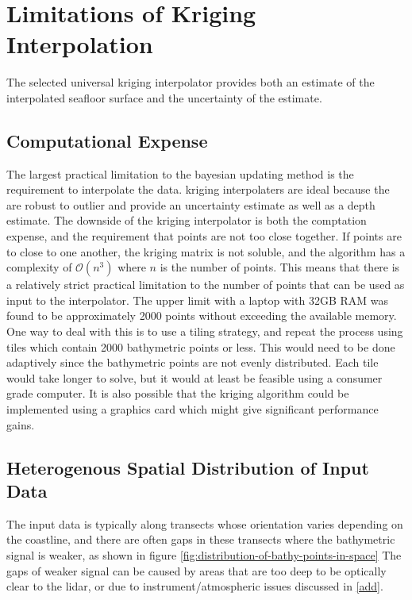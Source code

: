 \section{Limitations of Kriging Interpolation}

The selected universal kriging interpolator provides both an estimate of the interpolated seafloor surface and the uncertainty of the estimate.

\subsection{Computational Expense}

The largest practical limitation to the bayesian updating method is the requirement to interpolate the data. kriging interpolaters are ideal because the are robust to outlier and provide an uncertainty estimate as well as a depth estimate. The downside of the kriging interpolator is both the comptation expense, and the requirement that points are not too close together. If points are to close to one another, the kriging matrix is not soluble, and the algorithm has a complexity of $\mathcal{O}(n^3)$ where $n$ is the number of points. This means that there is a relatively strict practical limitation to the number of points that can be used as input to the interpolator. The upper limit with a laptop with 32GB RAM was found to be approximately 2000 points without exceeding the available memory. One way to deal with this is to use a tiling strategy, and repeat the process using tiles which contain 2000 bathymetric points or less. This would need to be done adaptively since the bathymetric points are not evenly distributed. Each tile would take longer to solve, but it would at least be feasible using a consumer grade computer. It is also possible that the kriging algorithm could be implemented using a graphics card which might give significant performance gains.

\subsection{Heterogenous Spatial Distribution of Input Data}

The input data is typically along transects whose orientation varies depending on the coastline, and there are often gaps in these transects where the bathymetric signal is weaker, as shown in figure \ref{fig:distribution-of-bathy-points-in-space} The gaps of weaker signal can be caused by areas that are too deep to be optically clear to the lidar, or due to instrument/atmospheric issues discussed in \ref{add}. 

